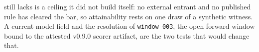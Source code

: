still lacks is a ceiling it did not build itself: no external entrant and no published rule has cleared the bar, so attainability rests on one draw of a synthetic witness. A current-model field and the resolution of \texttt{window-003}, the open forward window bound to the attested v0.9.0 scorer artifact, are the two tests that would change that.
